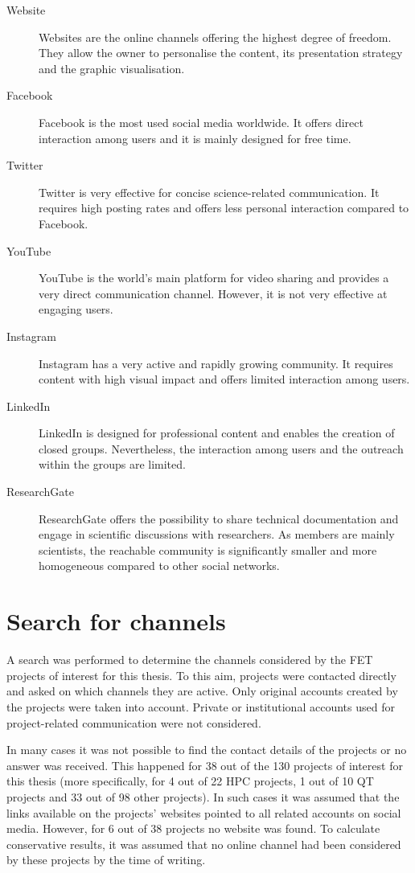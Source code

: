 \begin{description}
 \item [Website] Websites are the online channels offering the highest degree of freedom. They allow the owner to personalise the content, its presentation strategy and the graphic visualisation.
 \item [Facebook] Facebook is the most used social media worldwide. It offers direct interaction among users and it is mainly designed for free time.  
 \item [Twitter] Twitter is very effective for concise science-related communication. It requires high posting rates and offers less personal interaction compared to Facebook.
 \item [YouTube] YouTube is the world's main platform for video sharing and provides a very direct communication channel. However, it is not very effective at engaging users.
 \item [Instagram] Instagram has a very active and rapidly growing community. It requires content with high visual impact and offers limited interaction among users.
 \item [LinkedIn] LinkedIn is designed for professional content and enables the creation of closed groups. Nevertheless, the interaction among users and the outreach within the groups are limited.
 \item [ResearchGate] ResearchGate offers the possibility to share technical documentation and engage in scientific discussions with researchers. As members are mainly scientists, the reachable community is significantly smaller and more homogeneous compared to other social networks.  
\end{description}

\section{Search for channels} \label{Search_for_channels}
A search was performed to determine the channels considered by the FET projects of interest for this thesis. To this aim, projects were contacted directly and asked on which channels they are active. Only original accounts created by the projects were taken into account. Private or institutional accounts used for project-related communication were not considered.  

In many cases it was not possible to find the contact details of the projects or no answer was received. This happened for 38 out of the 130 projects of interest for this thesis (more specifically, for 4 out of 22 HPC projects, 1 out of 10 QT projects and 33 out of 98 other projects). In such cases it was assumed that the links available on the projects' websites pointed to all related accounts on social media. However, for 6 out of 38 projects no website was found. To calculate conservative results, it was assumed that no online channel had been considered by these projects by the time of writing.

